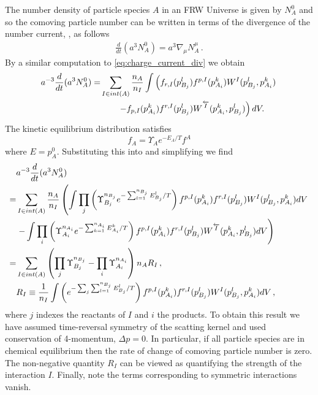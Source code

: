 {The number density of particle species $A$ in an FRW Universe is given by $N_A^0$ and so the comoving particle number can be written in terms of the divergence of the number current, , as follows
\begin{align}
\frac{d}{dt}(a^3N^0_A)=a^{3} \nabla_\mu N_A^\mu\,.  
\end{align}
By a similar computation to \eqref{eq:charge_current_div} we obtain
\begin{align}\label{eq:FRWcomovingNumGen}
a^{-3}\frac{d}{dt}(a^3N^0_A)=&\sum_{I\in int(A)} \frac{n_A}{n_I}\int\left(f_{r,I}(p_{B_j}^l)f^{p,I}(p_{A_i}^k)W^I(p_{B_j}^l,p_{A_i}^k) \right.\\
&\left. \qquad-f_{p,I}(p_{A_i}^k)f^{r,I}(p_{B_j}^l)W^{\overleftarrow{I}}(p_{A_i}^k,p_{B_j}^l)\right)  dV.\notag
\end{align}
The kinetic equilibrium distribution satisfies
\begin{equation}
f_A=\Upsilon_A e^{-E_A/T}f^A
\end{equation}
where $E=p_A^0$. Substituting this into  and simplifying we find
\begin{align}\label{eq:comovingPartNumFRWfinal}
&a^{-3}\frac{d}{dt}(a^3N_A^0)\\
=&\sum_{I\in int(A)}\frac{n_A}{n_I}\left(\int \prod_j\left(\Upsilon_{B_j}^{n_{B_j}}e^{-\sum_{l=1}^{n_{B_j}}E_{B_j}^l/T}\right)f^{p,I}(p_{A_i}^k)f^{r,I}(p_{B_j}^l)W^I(p_{B_j}^l,p_{A_i}^k)dV\right.\notag\\
&\left. -\int \prod_i\left(\Upsilon_{A_i}^{n_{A_i}}e^{-\sum_{k=1}^{n_{A_i}}E_{A_i}^k/T}\right)f^{p,I}(p_{A_i}^k)f^{r,I}(p_{B_j}^l)W^{\overleftarrow{I}}(p_{A_i}^k,p_{B_j}^l)dV\right)\notag\\
=&\sum_{I\in int(A)}\left(\prod_j\Upsilon_{B_j}^{n_{B_j}}- \prod_i\Upsilon_{A_i}^{n_{A_i}}\right){n_A}R_I\,,\notag\\
&R_I\equiv \frac{1}{n_I}\int\left(e^{-\sum_j\sum_{l=1}^{n_{B_j}}E_{B_j}^l/T}\right) f^{p,I}(p_{A_i}^k)f^{r,I}(p_{B_j}^l)W^I(p_{B_j}^l,p_{A_i}^k)dV\notag\,,
\end{align}
where $j$ indexes the reactants of $I$ and $i$ the products. To obtain this result we have assumed time-reversal symmetry of the scatting kernel  and used conservation of 4-momentum, $\Delta p=0$.    In particular, if all particle species are in chemical equilibrium then the rate of change of comoving particle number is zero. The non-negative quantity $R_I$ can be viewed as quantifying the strength of the interaction $I$. Finally, note the terms corresponding to symmetric interactions vanish. 

}
